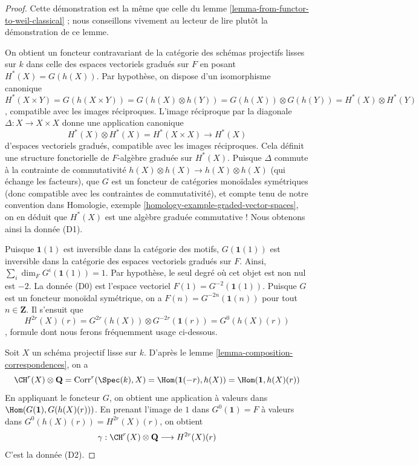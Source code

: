 \begin{proof}
Cette démonstration est la même que celle du
lemme \ref{lemma-from-functor-to-weil-classical} ;
nous conseillons vivement au lecteur de lire plutôt la démonstration de ce lemme.

\medskip\noindent
On obtient un foncteur contravariant de la catégorie des schémas projectifs
lisses sur $k$ dans celle des espaces vectoriels gradués sur $F$
en posant $H^*(X) = G(h(X))$. Par hypothèse, on dispose d'un isomorphisme
canonique
$$
H^*(X \times Y) = G(h(X \times Y)) = G(h(X) \otimes h(Y)) =
G(h(X)) \otimes G(h(Y)) = H^*(X) \otimes H^*(Y)
$$,
compatible avec les images réciproques. L'image réciproque par la diagonale
$\Delta : X \to X \times X$ donne une application canonique
$$
H^*(X) \otimes H^*(X) = H^*(X \times X) \to H^*(X)
$$
d'espaces vectoriels gradués, compatible avec les images réciproques.
Cela définit une structure fonctorielle de $F$-algèbre graduée sur
$H^*(X)$. Puisque $\Delta$ commute à la contrainte de commutativité
$h(X) \otimes h(X) \to h(X) \otimes h(X)$ (qui échange les facteurs),
que $G$ est un foncteur de catégories monoïdales symétriques (donc compatible avec
les contraintes de commutativité), et compte tenu de notre convention dans
Homologie, exemple \ref{homology-example-graded-vector-spaces},
on en déduit que $H^*(X)$ est une algèbre graduée
commutative ! Nous obtenons ainsi la donnée (D1).

\medskip\noindent
Puisque $\mathbf{1}(1)$ est inversible dans la catégorie des motifs,
$G(\mathbf{1}(1))$ est inversible dans la catégorie des
espaces vectoriels gradués sur $F$. Ainsi, $\sum_i \dim_F G^i(\mathbf{1}(1)) = 1$.
Par hypothèse, le seul degré où cet objet est non nul est $-2$.
La donnée (D0) est l'espace vectoriel $F(1) = G^{-2}(\mathbf{1}(1))$.
Puisque $G$ est un foncteur monoïdal symétrique,
on a $F(n) = G^{-2n}(\mathbf{1}(n))$ pour tout $n \in \mathbf{Z}$.
Il s'ensuit que
$$
H^{2r}(X)(r) = G^{2r}(h(X)) \otimes G^{-2r}(\mathbf{1}(r)) =
G^0(h(X)(r))
$$,
formule dont nous ferons fréquemment usage ci-dessous.

\medskip\noindent
Soit $X$ un schéma projectif lisse sur $k$. D'après
le lemme \ref{lemma-composition-correspondences}, on a
$$
\CH^r(X) \otimes \mathbf{Q} = \text{Corr}^r(\Spec(k), X) =
\Hom(\mathbf{1}(-r), h(X)) = \Hom(\mathbf{1}, h(X)(r))
$$
En appliquant le foncteur $G$, on obtient une application à valeurs dans
$\Hom(G(\mathbf{1}), G(h(X)(r)))$.
En prenant l'image de $1$ dans $G^0(\mathbf{1}) = F$
à valeurs dans $G^0(h(X)(r)) = H^{2r}(X)(r)$, on obtient
$$
\gamma :
\CH^r(X) \otimes \mathbf{Q} \longrightarrow H^{2r}(X)(r)
$$
C'est la donnée (D2).


\end{proof}

